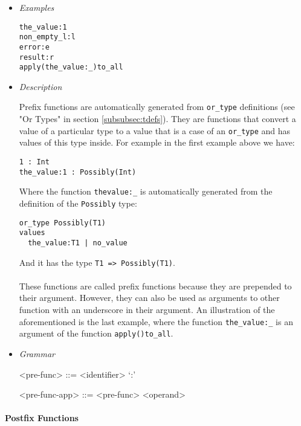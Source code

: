 \documentclass{article}
\begin{document}
\begin{itemize}

\item \textit{Examples}
\begin{verbatim}
the_value:1
non_empty_l:l
error:e
result:r
apply(the_value:_)to_all
\end{verbatim}

\item \textit{Description}

Prefix functions are automatically generated from \texttt{or_type} definitions
(see "Or Types" in section \ref{subsubsec:tdefs}). They are functions that
convert a value of a particular type to a value that is a case of an
\texttt{or_type} and has values of this type inside. For example in the
first example above we have:
\begin{verbatim}
1 : Int
the_value:1 : Possibly(Int)
\end{verbatim}
Where the function \texttt{thevalue:_} is automatically generated from the
definition of the \texttt{Possibly} type:
\begin{verbatim}
or_type Possibly(T1)
values
  the_value:T1 | no_value
\end{verbatim}
And it has the type \texttt{T1 => Possibly(T1)}.
\\\\
These functions are called prefix functions because they are prepended to
their argument. However, they can also be used as arguments to other function
with an underscore in their argument.
An illustration of the aforementioned is the last example, where the function
\texttt{the_value:_} is an argument of the function \texttt{apply()to_all}.

\item \textit{Grammar}
\begin{grammar}
<pre-func> ::= <identifier> `:'

<pre-func-app> ::= <pre-func> <operand>
\end{grammar}

\end{itemize}

\newpage
\paragraph{Postfix Functions}
\end{document}
